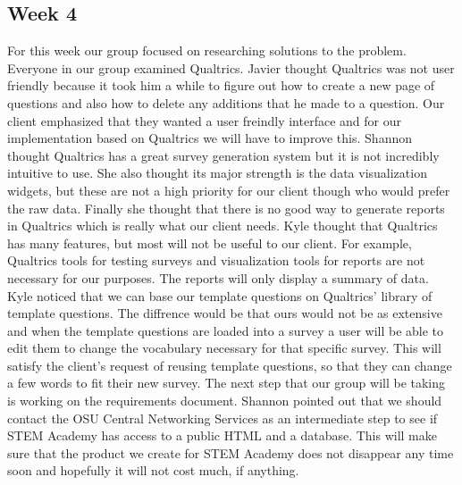\documentclass[letterpaper,10pt,serif, draftclsnofoot,onecolumn, compsoc, titlepage]{IEEEtran}
\begin{document}
\subsection{Week 4}
For this week our group focused on researching solutions to the problem. Everyone in our group examined Qualtrics. Javier thought Qualtrics was not user friendly because it took him a while to figure out how to create a new page of questions and also how to delete any additions that he made to a question. Our client emphasized that they wanted a user freindly interface and for our implementation based on Qualtrics we will have to improve this. Shannon thought Qualtrics has a great survey generation system but it is not incredibly intuitive to use. She also thought its major strength is the data visualization widgets, but these are not a high priority for our client though who would prefer the raw data. Finally she thought that there is no good way to generate reports in Qualtrics which is really what our client needs. Kyle thought that Qualtrics has many features, but most will not be useful to our client. For example, Qualtrics tools for testing surveys and visualization tools for reports are not necessary for our purposes. The reports will only display a summary of data. Kyle noticed that we can base our template questions on Qualtrics'  library of template questions. The diffrence would be that ours would not be as extensive and when the template questions are loaded into a survey a user will be able to edit them to change the vocabulary necessary for that specific survey. This will satisfy the client's request of reusing template questions, so that they can change a few words to fit their new survey. The next step that our group will be taking is working on the requirements document. Shannon pointed out that we should contact the OSU Central Networking Services as an intermediate step to see if STEM Academy has access to a public HTML and a database. This will make sure that the product we create for STEM Academy does not disappear any time soon and hopefully it will not cost much, if anything. 
\end{document}
